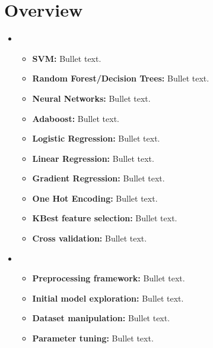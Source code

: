 \section{Overview}
\medskip
\begin{itemize}

    \item {}
    \begin{itemize}
    \item \textbf{SVM:} Bullet text.
    \item \textbf{Random Forest/Decision Trees:} Bullet text.
    \item \textbf{Neural Networks:} Bullet text.
    \item \textbf{Adaboost:} Bullet text.
    \item \textbf{Logistic Regression:} Bullet text.
    \item \textbf{Linear Regression:} Bullet text.
    \item \textbf{Gradient Regression:} Bullet text.
    \item \textbf{One Hot Encoding:} Bullet text.
    \item \textbf{KBest feature selection:} Bullet text.
    \item \textbf{Cross validation:} Bullet text.

    \end{itemize}

    \item {}
    \begin{itemize}
    \item \textbf{Preprocessing framework:} Bullet text.
    \item \textbf{Initial model exploration:} Bullet text.
    \item \textbf{Dataset manipulation:} Bullet text.
    \item \textbf{Parameter tuning:} Bullet text.
    \end{itemize}

\end{itemize}



